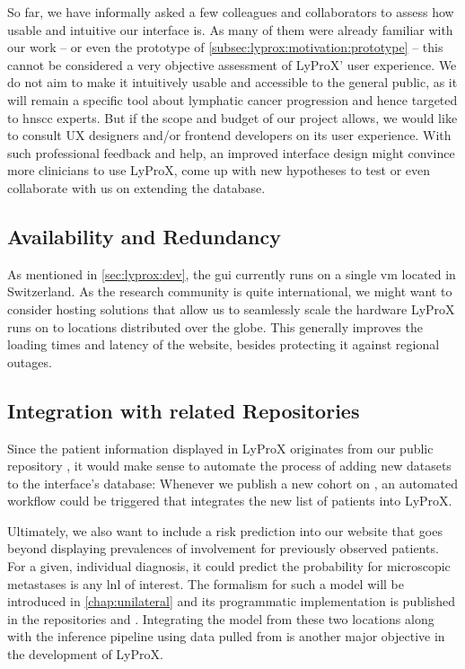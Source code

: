 \documentclass[\relativeRoot/main.tex]{subfiles}
\begin{document}
So far, we have informally asked a few colleagues and collaborators to assess how usable and intuitive our interface is. As many of them were already familiar with our work -- or even the prototype of \cref{subsec:lyprox:motivation:prototype} -- this cannot be considered a very objective assessment of LyProX' user experience. We do not aim to make it intuitively usable and accessible to the general public, as it will remain a specific tool about lymphatic cancer progression and hence targeted to \gls{hnscc} experts. But if the scope and budget of our project allows, we would like to consult UX designers and/or frontend developers on its user experience. With such professional feedback and help, an improved interface design might convince more clinicians to use LyProX, come up with new hypotheses to test or even collaborate with us on extending the database.

\subsection*{Availability and Redundancy}

As mentioned in \cref{sec:lyprox:dev}, the \gls{gui} currently runs on a single \gls{vm} located in Switzerland. As the research community is quite international, we might want to consider hosting solutions that allow us to seamlessly scale the hardware LyProX runs on to locations distributed over the globe. This generally improves the loading times and latency of the website, besides protecting it against regional outages.

\subsection*{Integration with related Repositories}

Since the patient information displayed in LyProX originates from our public repository , it would make sense to automate the process of adding new datasets to the interface's database: Whenever we publish a new cohort on , an automated workflow could be triggered that integrates the new list of patients into LyProX.

Ultimately, we also want to include a risk prediction into our website that goes beyond displaying prevalences of involvement for previously observed patients. For a given, individual diagnosis, it could predict the probability for microscopic metastases is any \gls{lnl} of interest. The formalism for such a model will be introduced in \cref{chap:unilateral} and its programmatic implementation is published in the repositories  and . Integrating the model from these two locations along with the inference pipeline using data pulled from  is another major objective in the development of LyProX.
\end{document}
